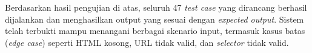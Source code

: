 Berdasarkan hasil pengujian di atas, seluruh 47 \textit{test case} yang dirancang berhasil dijalankan dan menghasilkan output yang sesuai dengan \textit{expected output}. Sistem telah terbukti mampu menangani berbagai skenario input, termasuk kasus batas (\textit{edge case}) seperti HTML kosong, URL tidak valid, dan \textit{selector} tidak valid.







